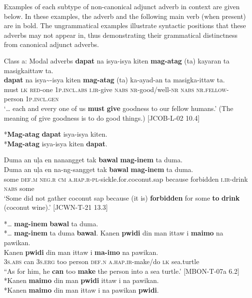 Examples of each subtype of non-canonical adjunct adverb in context are given below. In these examples, the adverb and the following main verb (when present) are in bold. The ungrammatical examples illustrate syntactic positions that these adverbs may not appear in, thus demonstrating their grammatical distinctness from canonical adjunct adverbs.

\newpage
\ea Class a: Modal adverbs
\ea
\textbf{dapat}  na  isya-isya  kiten  \textbf{mag-atag}  (ta)   kayaran ta  masigkaittaw  ta. \\\smallskip
 \gll \textbf{dapat}  na  isya\sim{}-isya  kiten  \textbf{mag-atag}  (ta)\footnotemark{}   ka-ayad-an ta  masigka-ittaw  ta. \\
must  \textsc{lk}  \textsc{red}-one  1\textsc{p.incl.abs}  \textsc{i.ir}-give  \textsc{nabs}  \textsc{nr}-good/well-\textsc{nr}
\textsc{nabs}  \textsc{nr.fellow}-person  1\textsc{p.incl.gen} \\
\glt `… each and every one of us \textbf{must} \textbf{give} goodness to our fellow humans.’ (The meaning of give goodness is to do good things.) [JCOB-L-02 10.4] \\\smallskip

*\textbf{Mag-atag} \textbf{dapat} isya-isya kiten. \\
*\textbf{Mag-atag} isya-isya kiten \textbf{dapat}.

\ex
Duma  an  uļa  en  nanangget  tak  \textbf{bawal}  \textbf{mag-inem}  ta  duma. \\\smallskip
 \gll Duma  an  uļa  en  na-ng-sangget  tak  \textbf{bawal}  \textbf{mag-inem}  ta  duma. \\
some  \textsc{def.m}  \textsc{neg.r}  \textsc{cm}  \textsc{a.hap.r}-\textsc{pl}-sickle.for.coconut.sap  because  forbidden  \textsc{i.ir}-drink  \textsc{nabs}  some \\
\glt `Some did not gather coconut sap because (it is) \textbf{forbidden} for some \textbf{to} \textbf{drink} (coconut wine).’ [JCWN-T-21 13.3] \\\smallskip

*… \textbf{mag-inem} \textbf{bawal} ta duma. \\
*… \textbf{mag-inem} ta duma \textbf{bawal}.
\ex
Kanen  \textbf{pwidi}  din  man  ittaw  i  \textbf{maimo}  na  pawikan. \\\smallskip
 \gll Kanen  \textbf{pwidi}  din  man  ittaw  i  \textbf{ma-imo}  na  pawikan. \\
3\textsc{s.abs}  can  3\textsc{s.erg}  too  person  \textsc{def.n}  \textsc{a.}\textsc{hap}\textsc{.ir}-make/do  \textsc{lk}  sea.turtle \\
\glt “As for him, he \textbf{can} too \textbf{make} the person into a sea turtle.’ [MBON-T-07a 6.2] \\
*Kanen \textbf{maimo} din man \textbf{pwidi} ittaw i na pawikan. \\
*Kanen \textbf{maimo} din man ittaw i na pawikan \textbf{pwidi}.
\z


